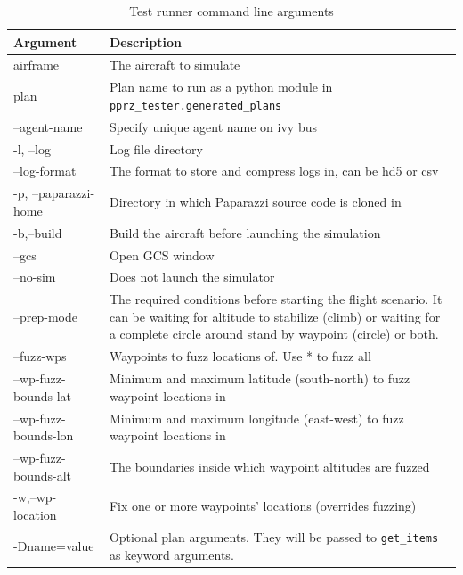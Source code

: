 \begin{table}
    \centering
\begin{longtable}{lp{}}
\toprule
\textbf{Argument}   & \textbf{Description}\\ \hline
\endhead
%
\hline
\endfoot
%
\endlastfoot
airframe              &  The aircraft to simulate \\
plan                  &  Plan name to run as a python module in \verb|pprz_tester.generated_plans| \\
--agent-name          &  Specify unique agent name on ivy bus \\
-l, --log             &  Log file directory \\
--log-format          &  The format to store and compress logs in, can be hd5 or csv \\ \hline
-p, --paparazzi-home  &  Directory in which Paparazzi source code is cloned in \\
-b,--build            &  Build the aircraft before launching the simulation \\
--gcs                 &  Open GCS window \\
--no-sim              &  Does not launch the simulator \\
--prep-mode           &  The required conditions before starting the flight scenario. It can be waiting for altitude to stabilize (climb) or waiting for a complete circle around stand by waypoint (circle) or both. \\ \hline
--fuzz-wps            &  Waypoints to fuzz locations of. Use * to fuzz all \\
--wp-fuzz-bounds-lat  &  Minimum and maximum latitude (south-north) to fuzz waypoint locations in \\
--wp-fuzz-bounds-lon  &  Minimum and maximum longitude (east-west) to fuzz waypoint locations in \\
--wp-fuzz-bounds-alt  &  The boundaries inside which waypoint altitudes are fuzzed \\
-w,--wp-location      &  Fix one or more waypoints' locations (overrides fuzzing) \\ \hline
-Dname=value          &  Optional plan arguments. They will be passed to \verb|get_items| as keyword arguments. \\ \bottomrule
\end{longtable}
\caption{Test runner command line arguments}
\label{tab:test_runner_commandline_args}
\end{table}


